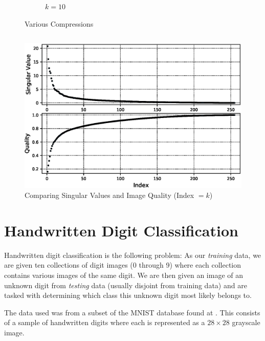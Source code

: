\documentclass[a4paper]{article}
\begin{document}
\begin{figure}[H]
\begin{subfigure}[b]{0.22\textwidth}
                \caption{$k=10$}
                \label{fig:compressed10}
        \end{subfigure}
        \caption{Various Compressions}\label{fig:compression}
\end{figure}


$$
$$


\begin{figure}[H]
\centering
\includegraphics[]{plot}
\caption{Comparing Singular Values and Image Quality (Index $=k$)}\label{fig:singularvalues}
\end{figure}


\pagebreak







\section{Handwritten Digit Classification}

Handwritten digit classification is the following problem: As our \textit{training} data, we are given ten collections of digit images (0 through 9) where each collection contains various images of the same digit.  We are then given an image of an unknown digit from \textit{testing} data (usually disjoint from training data) and are tasked with determining which class this unknown digit most likely belongs to.

The data used was from a subset of the MNIST database found at \cite{mnist}.  This consists of a sample of handwritten digits where each is represented as a $28\times 28$ grayscale image.
\end{document}
